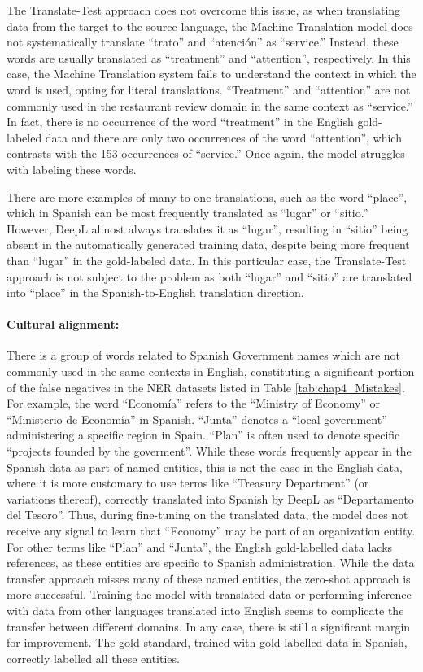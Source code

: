The Translate-Test approach does not overcome this issue, as when translating data from the target to the source language, the Machine Translation model does not systematically translate ``trato'' and ``atención'' as ``service.'' Instead, these words are usually translated as ``treatment'' and ``attention'', respectively. In this case, the Machine Translation system fails to understand the context in which the word is used, opting for literal translations. ``Treatment'' and ``attention'' are not commonly used in the restaurant review domain in the same context as ``service.'' In fact, there is no occurrence of the word ``treatment'' in the English gold-labeled data and there are only two occurrences of the word ``attention'', which contrasts with the 153 occurrences of ``service.'' Once again, the model struggles with labeling these words.



There are more examples of many-to-one translations, such as the word ``place'', which in Spanish can be most frequently translated as ``lugar'' or ``sitio.'' However, DeepL almost always translates it as ``lugar'', resulting in ``sitio'' being absent in the automatically generated training data, despite being more frequent than ``lugar'' in the gold-labeled data. In this particular case, the Translate-Test approach is not subject to the problem as both ``lugar'' and ``sitio'' are translated into ``place'' in the Spanish-to-English translation direction.

\paragraph{Cultural alignment:} There is a group of words related to Spanish Government names which are not commonly used in the same contexts in English, constituting a significant portion of the false negatives in the NER datasets listed in Table \ref{tab:chap4_Mistakes}. For example, the word ``Economía'' refers to the ``Ministry of Economy'' or ``Ministerio de Economía'' in Spanish. ``Junta'' denotes a ``local government'' administering a specific region in Spain. ``Plan'' is often used to denote specific ``projects founded by the goverment''. While these words frequently appear in the Spanish data as part of named entities, this is not the case in the English data, where it is more customary to use terms like ``Treasury Department'' (or variations thereof), correctly translated into Spanish by DeepL as ``Departamento del Tesoro''. Thus, during fine-tuning on the translated data, the model does not receive any signal to learn that ``Economy'' may be part of an organization entity. For other terms like ``Plan'' and ``Junta'', the English gold-labelled data lacks references, as these entities are specific to Spanish administration. While the data transfer approach misses many of these named entities, the zero-shot approach is more successful. Training the model with translated data or performing inference with data from other languages translated into English seems to complicate the transfer between different domains. In any case, there is still a significant margin for improvement. The gold standard, trained with gold-labelled data in Spanish, correctly labelled all these entities.


